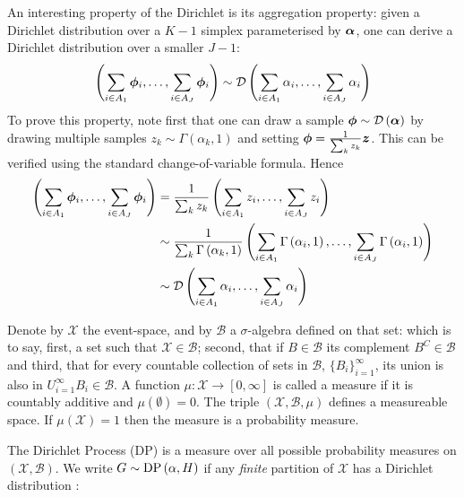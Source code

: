 An interesting property of the Dirichlet is its aggregation property: given a Dirichlet distribution over a $K-1$ simplex parameterised by $\bm \alpha$, one can derive a Dirichlet distribution over a smaller $J-1$:
\begin{equation}
\left(
    \sum_{i \in A_1} { \bm \phi }_i, \ldots, \sum_{i \in A_J} { \bm \phi }_i
\right)
\sim
\mathcal{D} \left( {
    \sum_{i \in A_1} \alpha_i, \ldots, \sum_{i \in A_J} \alpha_i
} \right)
\end{equation}
To prove this property, note first that one can draw a sample ${ \bm \phi } \sim \mathcal{D} \left( {\bm \alpha} \right)$ by drawing multiple samples $z_k \sim \Gamma(\alpha_k, 1)$ and setting ${ \bm \phi } = \frac{1}{ {\sum_k z_k} } \bm z$. This can be verified using the standard change-of-variable formula. Hence
\begin{align}
\begin{split}
\left(
    \sum_{i \in A_1} { \bm \phi }_i, \ldots, \sum_{i \in A_J} { \bm \phi }_i 
\right)
& = 
\frac{1}{ {\sum_k z_k} }
\left(
    \sum_{i \in A_1} z_i, \ldots, \sum_{i \in A_J} z_i
\right) \\& \sim
\frac{1}{ {\sum_k \Gamma \left( {\alpha_k}, {1} \right)} }
\left(
    \sum_{i \in A_1} \Gamma \left( {\alpha_i}, {1} \right), \ldots, \sum_{i \in A_J} \Gamma \left( {\alpha_i}, {1} \right)
\right) \\
& \sim
\mathcal{D} \left( {
    \sum_{i \in A_1} \alpha_i, \ldots, \sum_{i \in A_J} \alpha_i
} \right)
\end{split}
\end{align}


\newcommand \eventspace { \mathcal{X}  }
\newcommand \sigalgebra { \mathcal{B}  }

Denote by $\eventspace$ the event-space, and by $\sigalgebra$ a $\sigma$-algebra defined on that set: which is to say, first, a set such that $\eventspace \in \sigalgebra$; second, that if $B \in \sigalgebra$ its complement $B^{C} \in \sigalgebra$ and third, that for every countable collection of sets in $\sigalgebra$, $\{ B_i \}_{i=1}^{\infty}$, its union is also in $U_{i=1}^{\infty} B_i \in \sigalgebra$. A function $\mu : \eventspace \rightarrow [0, \infty]$ is called a measure if it is countably additive and $\mu( \emptyset ) = 0$. The triple $(\eventspace, \sigalgebra, \mu)$ defines a measureable space. If $\mu(\eventspace) = 1$ then the measure is a probability measure.

The Dirichlet Process (DP) is a measure over all possible probability measures on $(\eventspace, \sigalgebra)$. We write $G \sim \text{DP} \left( {\alpha, H} \right)$ if any \emph{finite} partition of $\eventspace$ has a Dirichlet distribution\cite{Ferguson1973} :

